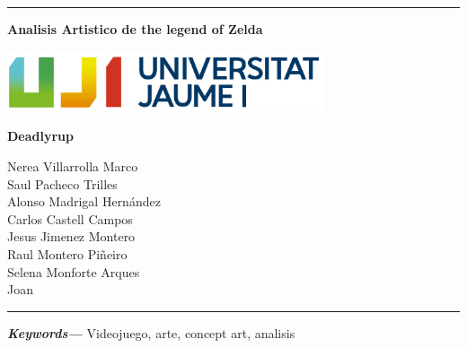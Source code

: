 \documentclass[12pt]{article}
\date{}
\providecommand{\keywords}[1]
{
  \small
  \textbf{\textit{Keywords---}} #1
}
\begin{document}
    \begin{titlepage}

        \centering
        \hrule
        \vspace{1cm}
        {\bfseries\huge Analisis Artistico de the legend of Zelda \par}
        \vspace{3cm}
        {\includegraphics[width=0.7\textwidth]{UJI_logo.jpg} \par}
        \vspace{4cm}
        {\LARGE \textbf{Deadlyrup} \par}

        {\large
        Nerea Villarrolla Marco \\
        Saul Pacheco Trilles \\
        Alonso Madrigal Hernández \\
        Carlos Castell Campos \\
        Jesus Jimenez Montero \\
        Raul Montero Piñeiro \\
        Selena Monforte Arques \\
        Joan \\
        \par}
        \vspace{10cm}
        \hrule

    \end{titlepage}

\newpage
\begin{abstract}
    En el siguiente documento hablaremos sobre las bases artisticas del videojuego "The Legend Of Zelda: Breath of the wild". Tanto del director de concept art como un atisbo de información sobre el juego. Finalemnete acabaremos con el analisis artistico profundo de varios fan arts.

\end{abstract}

\keywords{Videojuego, arte, concept art, analisis}

\newpage
\tableofcontents
\setcounter{tocdepth}{4}
\end{document}
